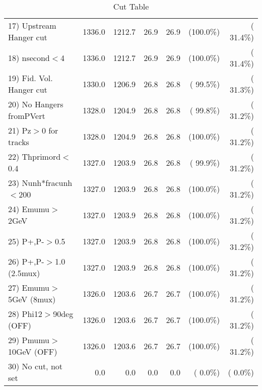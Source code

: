 \begin{table}[h!]
\begin{tabular}{||l||r|r|r|r|r|r||}
 17) Upstream Hanger cut  &       1336.0 &       1212.7 &         26.9 &         26.9 & (100.0\%) & ( 31.4\%) \\
 18) nsecond$<$4          &       1336.0 &       1212.7 &         26.9 &         26.9 & (100.0\%) & ( 31.4\%) \\
 19) Fid. Vol. Hanger cut &       1330.0 &       1206.9 &         26.8 &         26.8 & ( 99.5\%) & ( 31.3\%) \\
 20) No Hangers fromPVert &       1328.0 &       1204.9 &         26.8 &         26.8 & ( 99.8\%) & ( 31.2\%) \\
 21) Pz$>$0 for tracks    &       1328.0 &       1204.9 &         26.8 &         26.8 & (100.0\%) & ( 31.2\%) \\
 22) Thprimord$<$0.4      &       1327.0 &       1203.9 &         26.8 &         26.8 & ( 99.9\%) & ( 31.2\%) \\
 23) Nunh*fracunh$<$200   &       1327.0 &       1203.9 &         26.8 &         26.8 & (100.0\%) & ( 31.2\%) \\
 24) Emumu$>$2GeV         &       1327.0 &       1203.9 &         26.8 &         26.8 & (100.0\%) & ( 31.2\%) \\
 25) P+,P-$>$0.5          &       1327.0 &       1203.9 &         26.8 &         26.8 & (100.0\%) & ( 31.2\%) \\
 26) P+,P-$>$1.0 (2.5mux) &       1327.0 &       1203.9 &         26.8 &         26.8 & (100.0\%) & ( 31.2\%) \\
 27) Emumu$>$5GeV  (8mux) &       1326.0 &       1203.6 &         26.7 &         26.7 & (100.0\%) & ( 31.2\%) \\
 28) Phi12$>$90deg  (OFF) &       1326.0 &       1203.6 &         26.7 &         26.7 & (100.0\%) & ( 31.2\%) \\
 29) Pmumu$>$10GeV  (OFF) &       1326.0 &       1203.6 &         26.7 &         26.7 & (100.0\%) & ( 31.2\%) \\
 30) No cut, not set      &          0.0 &          0.0 &          0.0 &          0.0 & (  0.0\%) & (  0.0\%) \\
 \hline
 \hline
 \end{tabular}
 \caption{Cut Table           }
 \label{tab-cutheavy_neutrino_0.350}
 \end{table}

